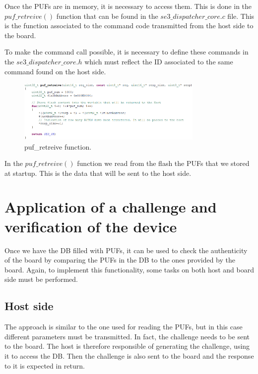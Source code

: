 Once the PUFs are in memory, it is necessary to access them. This is done in the $puf\_retreive()$ function that can be found in the $se3\_dispatcher\_core.c$ file. This is the function associated to the command code transmitted from the host side to the board.

To make the command call possible, it is necessary to define these commands in the $se3\_dispatcher\_core.h$ which must reflect the ID associated to the same command found on the host side.

\begin{figure}[h!]
	\vspace{0.5cm}
	\includegraphics[width = 0.8\textwidth]{images/puf_retreive.png}
	\caption{puf\_retreive function. }
	\label{fig:puf_retreive}
\end{figure}

In the $puf\_retreive()$ function we read from the flash the PUFs that we stored at startup. This is the data that will be sent to the host side.


\section {Application of a challenge and verification of the device} 
\label{section:impl_host}

Once we have the DB filled with PUFs, it can be used to check the authenticity of the board by comparing the PUFs in the DB to the ones provided by the board. Again, to implement this functionality, some tasks on both host and board side must be performed.

\subsection{Host side}

The approach is similar to the one used for reading the PUFs, but in this case different parameters must be transmitted. In fact, the challenge needs to be sent to the board. The host is therefore responsible of generating the challenge, using it to access the DB. Then the challenge is also sent to the board and the response to it is expected in return.

